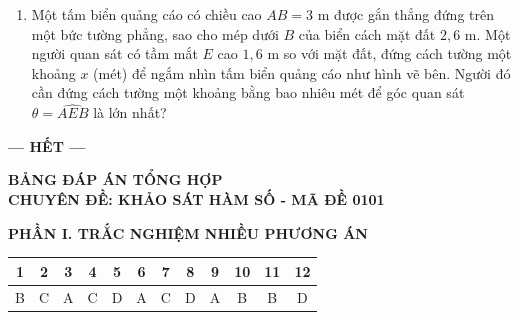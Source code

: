 \documentclass[12pt,a4paper]{article}
\begin{document}
\begin{enumerate}
\item \begin{minipage}[t]{0.56\linewidth}
Một tấm biển quảng cáo có chiều cao $AB = 3\text{ m}$ được gắn thẳng đứng trên một bức tường phẳng, sao cho mép dưới $B$ của biển cách mặt đất $2{,}6\text{ m}$. Một người quan sát có tầm mắt $E$ cao $1{,}6\text{ m}$ so với mặt đất, đứng cách tường một khoảng $x$ (mét) để ngắm nhìn tấm biển quảng cáo như hình vẽ bên. Người đó cần đứng cách tường một khoảng bằng bao nhiêu mét để góc quan sát $\theta = \widehat{AEB}$ là lớn nhất?
\end{minipage}\hfill
\begin{minipage}[t]{0.41\linewidth}\vspace{-0.4\baselineskip}\centering
{}
\end{minipage}
\end{enumerate}

\begin{center}\textbf{--- HẾT ---}\end{center}

\newpage
\begin{center}{\Large\textbf{BẢNG ĐÁP ÁN TỔNG HỢP}}\\[4pt]
\textbf{CHUYÊN ĐỀ: KHẢO SÁT HÀM SỐ - MÃ ĐỀ 0101}\end{center}

\textbf{PHẦN I. TRẮC NGHIỆM NHIỀU PHƯƠNG ÁN}
\begin{center}\renewcommand{\arraystretch}{1.5}\begin{tabular}{|*{12}{c|}}\hline
1 & 2 & 3 & 4 & 5 & 6 & 7 & 8 & 9 & 10 & 11 & 12\\\hline
B & C & A & C & D & A & C & D & A & B & B & D\\\hline
\end{tabular}\end{center}
\end{document}

